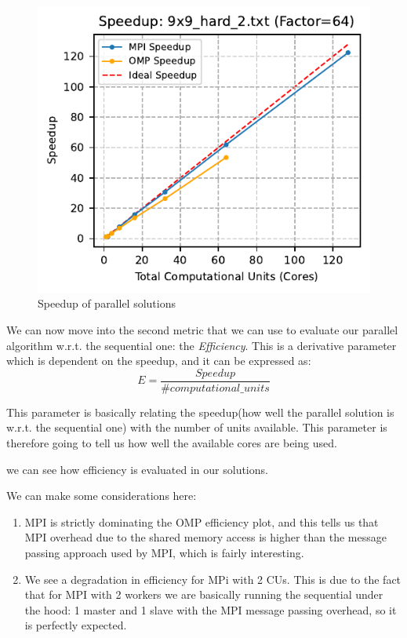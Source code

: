 \begin{figure}[htbp]
\centering
\includegraphics[width=0.9\linewidth]{imgs/speedup_mpi_omp_9x9_hard_2.pdf}
\caption{Speedup of parallel solutions}
\label{fig:speedup_9x9}
\end{figure}

We can now move into the second metric that we can use to evaluate our parallel algorithm w.r.t. the sequential one: the \textit{Efficiency}. This is a derivative parameter which is dependent on the speedup, and it can be expressed as:
\[
E = \frac{Speedup}{\# computational\_units}
\]

This parameter is basically relating the speedup(how well the parallel solution is w.r.t. the sequential one) with the number of units available. This parameter is therefore going to tell us how well the available cores are being used.

 we can see how efficiency is evaluated in our solutions. 

We can make some considerations here:
\begin{enumerate}
    \item MPI is strictly dominating the OMP efficiency plot, and this tells us that MPI overhead due to the shared memory access is higher than the message passing approach used by MPI, which is fairly interesting.
    \item We see a degradation in efficiency for MPi with 2 CUs. This is due to the fact that for MPI with 2 workers we are basically running the sequential under the hood: 1 master and 1 slave with the MPI message passing overhead, so it is perfectly expected.
\end{enumerate}

